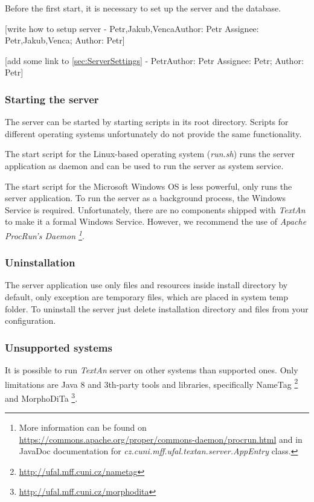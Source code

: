 \documentclass[12pt,a4paper]{report}
\makeatletter
\newcommand{\comment}[3][\@empty]{
  {\color{magenta}[#3 - }
  {\color{green}\ifx\@empty#1\relax Author: #2 \else Assignee: #1; Author: #2\fi}{\color{magenta}]}
}
\newcommand{\textan}{\emph{TextAn}}
\makeatother
\begin{document}
Before the first start, it is necessary to set up the server and the database.

\comment[Petr,Jakub,Venca]{Petr}{write how to setup server}

\comment[Petr]{Petr}{add some link to \ref{sec:ServerSettings}}

\subsubsection{Starting the server}

The server can be started by starting scripts in its root directory. Scripts for
different operating systems unfortunately do not provide the same functionality.

The start script for the Linux-based operating system (\emph{run.sh}) runs the
server application as daemon and can be used to run the server as system service.

The start script for the Microsoft Windows OS is less powerful, only runs the
server application. To run the server as a background process, the Windows Service
is required. Unfortunately, there are no components shipped with \textan{}
to make it a formal Windows Service. However, we recommend the use of \emph{Apache
ProcRun's Daemon \footnote{More information can be found on
\url{https://commons.apache.org/proper/commons-daemon/procrun.html} and in JavaDoc
documentation for \emph{cz.cuni.mff.ufal.textan.server.AppEntry} class.}}.

\subsubsection{Uninstallation}
The server application use only files and resources inside install directory by
default, only exception are temporary files, which are placed in system temp folder.
To uninstall the server just delete installation directory and files from your
configuration.

\subsubsection{Unsupported systems}
\label{sssec:unsupport}
It is possible to run \textan{} server on other systems than supported ones. Only
limitations are Java 8 and 3th-party tools and libraries, specifically NameTag%
\footnote{\url{http://ufal.mff.cuni.cz/nametag}} and MorphoDiTa%
\footnote{\url{http://ufal.mff.cuni.cz/morphodita}}.
\end{document}

